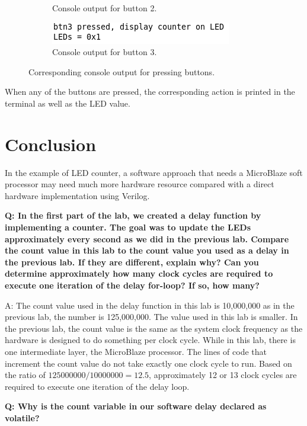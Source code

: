\documentclass[11pt,letterpaper,titlepage]{article}
\begin{document}
\begin{figure}[ht]
\begin{subfigure}[]{0.45\textwidth}
        \caption{Console output for button 2.}
    \end{subfigure}
    \begin{subfigure}[]{0.45\textwidth}
        \includegraphics[width=\linewidth]{Btn3.png}
        \caption{Console output for button 3.}
    \end{subfigure}
    \caption{Corresponding console output for pressing buttons.}
\end{figure}

When any of the buttons are pressed, the corresponding action is printed in the terminal as well as the LED value.

\newpage

\part{Conclusion}

In the example of LED counter, a software approach that needs a MicroBlaze soft processor may need much more hardware resource compared with a direct hardware implementation using Verilog.

\textbf{Q: In the first part of the lab, we created a delay function by implementing a counter. The goal was to update the LEDs approximately every second as we did in the previous lab. Compare the count value in this lab to the count value you used as a delay in the previous lab. If they are different, explain why? Can you determine approximately how many clock cycles are required to execute one iteration of the delay for-loop? If so, how many?}

A: The count value used in the delay function in this lab is 10,000,000 as in the previous lab, the number is 125,000,000. The value used in this lab is smaller. In the previous lab, the count value is the same as the system clock frequency as the hardware is designed to do something per clock cycle. While in this lab, there is one intermediate layer, the MicroBlaze processor. The lines of code that increment the count value do not take exactly one clock cycle to run. Based on the ratio of $ 125000000/10000000 = 12.5 $, approximately 12 or 13 clock cycles are required to execute one iteration of the delay loop.

\textbf{Q: Why is the count variable in our software delay declared as volatile?}
\end{document}
